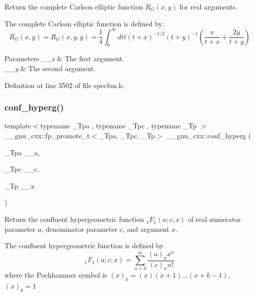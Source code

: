 Return the complete Carlson elliptic function $ R_G(x,y) $ for real arguments.

The complete Carlson elliptic function is defined by\+: \[ R_G(x,y) = R_G(x,y,y) = \frac{1}{4} \int_0^\infty dt t (t + x)^{-1/2}(t + y)^{-1} \left(\frac{x}{t + x} + \frac{2y}{t + y}\right) \]


\begin{DoxyParams}{Parameters}
{\em \+\_\+\+\_\+x} & The first argument. \\
\hline
{\em \+\_\+\+\_\+y} & The second argument. \\
\hline
\end{DoxyParams}


Definition at line 3502 of file specfun.\+h.

\mbox{\label{group__gnu__math__spec__func_ga4d01e85e7d295afca5d9f8b6c68f19cc}} 
\subsubsection{\texorpdfstring{conf\+\_\+hyperg()}{conf\_hyperg()}}
{\footnotesize\ttfamily template$<$typename \+\_\+\+Tpa , typename \+\_\+\+Tpc , typename \+\_\+\+Tp $>$ \\
\+\_\+\+\_\+gnu\+\_\+cxx\+::fp\+\_\+promote\+\_\+t$<$\+\_\+\+Tpa, \+\_\+\+Tpc, \+\_\+\+Tp$>$ \+\_\+\+\_\+gnu\+\_\+cxx\+::conf\+\_\+hyperg (\begin{DoxyParamCaption}\item[{\+\_\+\+Tpa}]{\+\_\+\+\_\+a,  }\item[{\+\_\+\+Tpc}]{\+\_\+\+\_\+c,  }\item[{\+\_\+\+Tp}]{\+\_\+\+\_\+x }\end{DoxyParamCaption})\hspace{0.3cm}{\ttfamily [inline]}}

Return the confluent hypergeometric function $ {}_1F_1(a;c;x) $ of real numerator parameter $ a $, denominator parameter $ c $, and argument $ x $.

The confluent hypergeometric function is defined by \[ {}_1F_1(a;c;x) = \sum_{n=0}^{\infty} \frac{(a)_n x^n}{(c)_n n!} \] where the Pochhammer symbol is $ (x)_k = (x)(x+1)...(x+k-1) $, $ (x)_0 = 1 $


